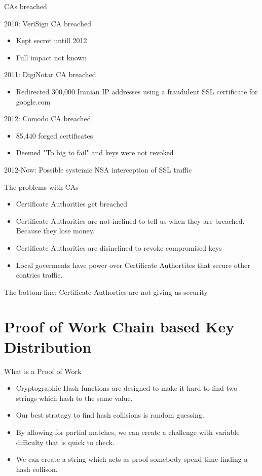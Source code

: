 \documentclass{beamer}
\begin{document}
\begin{frame}{CAs breached}

	2010: VeriSign CA breached
	\begin{itemize}
		\item{Kept secret untill 2012}
		\item{Full impact not known}
	\end{itemize}
	2011: DigiNotar CA breached
	\begin{itemize}
		\item{Redirected 300,000 Iranian IP addresses using a fraudulent SSL certificate for google.com}
	\end{itemize}
	2012: Comodo CA breached
	\begin{itemize}
		\item{85,440 forged certificates}
		\item{Deemed "To big to fail" and keys were not revoked}
	\end{itemize}
	2012-Now: Possible systemic NSA interception of SSL traffic

\end{frame}


\begin{frame}{The problems with CAs}

	\begin{itemize}
		\item{Certificate Authorities get breached}
		\item{Certificate Authorities are not inclined to tell us when they are breached. Because they lose money.}
		\item{Certificate Authorities are disinclined to revoke compromised keys}
		\item{Local goverments have power over Certificate Authortites that secure other contries traffic.}
	\end{itemize}

	The bottom line: Certificate Authorties are not giving us security

\end{frame}

\section{Proof of Work Chain based Key Distribution}

\begin{frame}{What is a Proof of Work}
	\begin{itemize}
		\item{Cryptographic Hash functions are designed to make it hard to find two strings which hash to the same value.}
		\item{Our best stratagy to find hash collisions is random guessing.}
		\item{By allowing for partial matches, we can create a challenge with variable difficulty that is quick to check.}
		\item{We can create a string which acts as proof somebody spend time finding a hash collison.}
	\end{itemize}
\end{frame}
\end{document}
